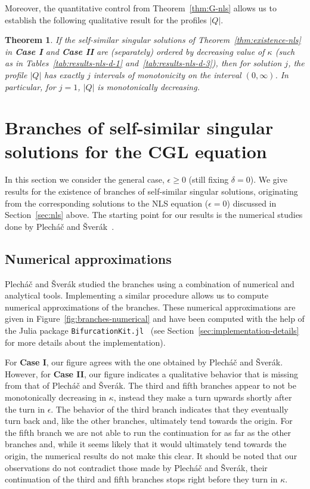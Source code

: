 \documentclass[11pt]{article}
\newtheorem{theorem}[definition]{Theorem}
\begin{document}
Moreover, the quantitative control from Theorem~\ref{thm:G-nls} allows
us to establish the following qualitative result for the profiles
\(|Q|\).
\begin{theorem}
  If the self-similar singular solutions of
  Theorem~\ref{thm:existence-nls} in \textbf{Case I} and \textbf{Case
    II} are (separately) ordered by decreasing value of \(\kappa\)
  (such as in Tables~\ref{tab:results-nls-d-1}
  and~\ref{tab:results-nls-d-3}), then for solution \(j\), the profile
  \(|Q|\) has exactly \(j\) intervals of monotonicity on the interval
  \((0, \infty)\). In particular, for \(j = 1\), \(|Q|\) is
  monotonically decreasing.
\end{theorem}

\section{Branches of self-similar singular solutions for the CGL equation}
\label{sec:branches}
In this section we consider the general case, \(\epsilon \geq 0\)
(still fixing \(\delta = 0\)). We give results for the existence of
branches of self-similar singular solutions, originating from the
corresponding solutions to the NLS equation (\(\epsilon = 0\))
discussed in Section~\ref{sec:nls} above. The starting point for our
results is the numerical studies done by Plecháč and
Šverák~\cite{Plech2001}.

\subsection{Numerical approximations}
\label{sec:numerical-approximations-cgl}
Plecháč and Šverák studied the branches using a combination of
numerical and analytical tools. Implementing a similar procedure
allows us to compute numerical approximations of the branches. These
numerical approximations are given in
Figure~\ref{fig:branches-numerical} and have been computed with the
help of the Julia package
\texttt{BifurcationKit.jl}~\cite{BifurcationKit} (see
Section~\ref{sec:implementation-details} for more details about the
implementation).

For \textbf{Case I}, our figure agrees with the one obtained by Plecháč
and Šverák. However, for \textbf{Case II}, our figure indicates a
qualitative behavior that is missing from that of Plecháč and Šverák.
The third and fifth branches appear to not be monotonically decreasing
in \(\kappa\), instead they make a turn upwards shortly after the turn
in \(\epsilon\). The behavior of the third branch indicates that they
eventually turn back and, like the other branches, ultimately tend
towards the origin. For the fifth branch we are not able to run the
continuation for as far as the other branches and, while it seems
likely that it would ultimately tend towards the origin, the numerical
results do not make this clear. It should be noted that our
observations do not contradict those made by Plecháč and Šverák, their
continuation of the third and fifth branches stops right before they
turn in \(\kappa\).
\end{document}
